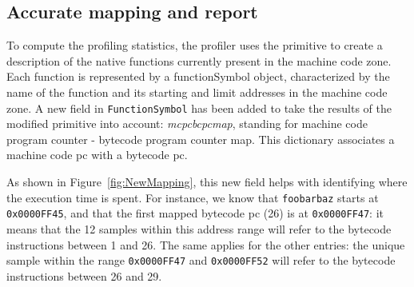\documentclass[10pt,nonatbib]{sigplanconf}
\newcommand{\ct}{\lstinline[backgroundcolor=\color{white},basicstyle=\small\ttfamily]}
\newcommand{\figref}[1]{Figure~\ref{fig:#1}}
\begin{document}
%

\subsection{Accurate mapping and report}

To compute the profiling statistics, the profiler uses the primitive to create a description of the native functions currently present in the machine code zone.  Each function is represented by a functionSymbol object, characterized by the name of the function and its starting and limit addresses in the machine code zone.
A new field in \ct{FunctionSymbol} has been added to take the results of the modified primitive into account: \textit{mcpcbcpcmap}, standing for machine code program counter - bytecode program counter map. This dictionary associates a machine code pc with a bytecode pc.

As shown in \figref{NewMapping}, this new field helps with identifying where the execution time is spent. For instance, we know that \ct{foobarbaz} starts at \ct{0x0000FF45}, and that the first mapped bytecode pc (26) is at \ct{0x0000FF47}: it means that the 12 samples within this address range will refer to the bytecode instructions between 1 and 26.
The same applies for the other entries: the unique sample within the range \ct{0x0000FF47} and \ct{0x0000FF52} will refer to the bytecode instructions between 26 and 29. 
\end{document}
